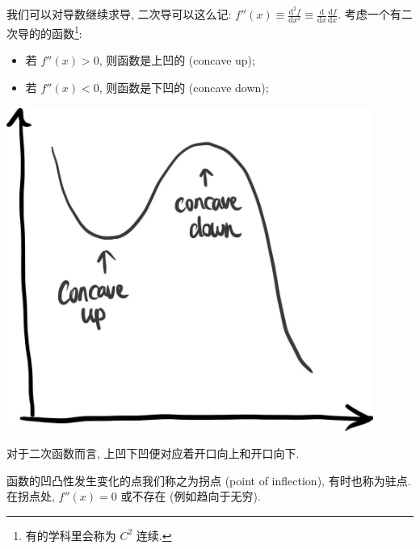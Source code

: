 \begin{tcolorbox}[size=fbox, breakable, enhanced jigsaw, title={二次导和凹凸性}]

我们可以对导数继续求导, 二次导可以这么记: $f''(x)\equiv \frac{\mathrm{d}^2f}{\mathrm{d}x^2}\equiv \frac{\mathrm{d}}{\mathrm{d}x}\frac{\mathrm{d}f}{\mathrm{d}x}$. 考虑一个有二次导的的函数\footnote{有的学科里会称为 $C^2$ 连续.}:

\begin{itemize}

\item
  若 $f''(x)>0$, 则函数是上凹的 (concave up);
\item
  若 $f''(x)<0$, 则函数是下凹的 (concave down);
\end{itemize}

\begin{tcolorbox}[size=fbox, breakable, enhanced jigsaw, sidebyside]
\includegraphics[width=0.9\textwidth]{img/image-20230614143547029.png}
\tcblower
\kaishu{\small }
\end{tcolorbox}

对于二次函数而言, 上凹下凹便对应着开口向上和开口向下.

函数的凹凸性发生变化的点我们称之为拐点 (point of inflection),
有时也称为驻点. 在拐点处, $f''(x)=0$ 或不存在 (例如趋向于无穷).

\end{tcolorbox}

